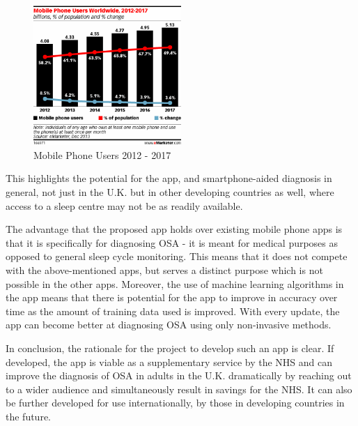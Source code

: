 \begin{figure}[!ht]
\centering
\includegraphics[width=0.5\textwidth]{drawings/mobilephoneusers.png}
\caption{Mobile Phone Users 2012 - 2017}
\label{fig:mobilephoneusers}
\end{figure}

This highlights the potential for the app, and smartphone-aided diagnosis in general, not just in the U.K. but in other developing countries as well, where access to a sleep centre may not be as readily available.

The advantage that the proposed app holds over existing mobile phone apps is that it is specifically for diagnosing OSA - it is meant for medical purposes as opposed to general sleep cycle monitoring. This means that it does not compete with the above-mentioned apps, but serves a distinct purpose which is not possible in the other apps. Moreover, the use of machine learning algorithms in the app means that there is potential for the app to improve in accuracy over time as the amount of training data used is improved. With every update, the app can become better at diagnosing OSA using only non-invasive methods.

In conclusion, the rationale for the project to develop such an app is clear. If developed, the app is viable as a supplementary service by the NHS and can improve the diagnosis of OSA in adults in the U.K. dramatically by reaching out to a wider audience and simultaneously result in savings for the NHS. It can also be further developed for use internationally, by those in developing countries in the future.
